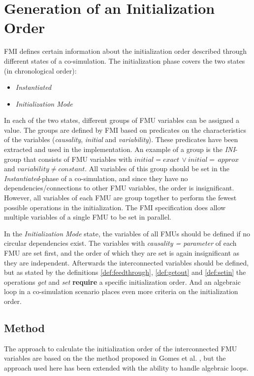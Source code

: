 \documentclass[runningheads]{llncs}
\begin{document}
\section{Generation of an Initialization Order}\label{sc:initilization}
FMI defines certain information about the initialization order described through different states of a co-simulation. The initialization phase covers the two states (in chronological order):
\begin{itemize}
    \item \textit{Instantiated}
    \item \textit{Initialization Mode}
\end{itemize}
In each of the two states, different groups of FMU variables can be assigned a value. The groups are defined by FMI based on predicates on the characteristics of the variables (\textit{causality}, \textit{initial} and \textit{variability}). These predicates have been extracted and used in the implementation. 
An example of a group is the \textit{INI}-group that consists of FMU variables with $initial = exact\, \lor initial = \,approx $  and $variability \neq constant$. All variables of this group should be set in the \textit{Instantiated}-phase of a co-simulation, and since they have no dependencies/connections to other FMU variables, the order is insignificant. However, all variables of each FMU are group together to perform the fewest possible operations in the initialization. The FMI specification does allow multiple variables of a single FMU to be set in parallel.

In the \textit{Initialization Mode} state, the variables of all FMUs should be defined if no circular dependencies exist. 
The variables with \textit{causality = parameter} of each FMU are set first, and the order of which they are set is again insignificant as they are independent.
Afterwards the interconnected variables should be defined, but as stated by the definitions \ref{def:feedthrough}, \ref{def:getout} and \ref{def:setin} the operations \textit{get} and \textit{set} \textbf{require} a specific initialization order. And an algebraic loop in a co-simulation scenario places even more criteria on the initialization order.


\subsection{Method}
The approach to calculate the initialization order of the interconnected FMU variables are based on the the method proposed in Gomes et al. \cite{Gomes2019b, BromanCompositionCo-Simulation}, but the approach used here has been extended with the ability to handle algebraic loops. 
\end{document}
